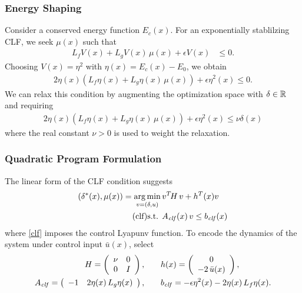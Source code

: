 \begin{frame}
  \frametitle{Energy Shaping}
  Consider a conserved energy function $E_{c}(x)$. For an exponentially stablilzing CLF, we seek $\mu(x)$ such that
  \begin{align*}
    L_f V(x) + L_g V(x) \, \mu(x) + \epsilon V(x) &\leq 0.
  \end{align*}
  Choosing $V(x) = \eta^2$ with $\eta(x) = E_{c}(x) - E_{0}$, we obtain
  \begin{align*}
    2 \eta(x) \left(L_f \eta(x) + L_g \eta(x) \, \mu(x) \right) + \epsilon \eta^2(x) \leq 0.
  \end{align*}
  We can relax this condition by augmenting the optimization space with $\delta \in \mathbb{R}$ and requiring
  \begin{align*}
    2 \eta(x) \left(L_f \eta(x) + L_g \eta(x) \, \mu(x) \right) + \epsilon \eta^2(x) \leq \nu \delta(x)
  \end{align*}
  where the real constant $\nu > 0$ is used to weight the relaxation.
\end{frame}

\begin{frame}[t]
  \frametitle{Quadratic Program Formulation}
  The linear form of the CLF condition suggests
  \begin{align}
    \nonumber
    (\delta^*(x), \mu(x)) = \argmin_{v = (\delta, u)}  \, & v^T \! H \, v + h^T(x) v\\
    \label{clf} \tag{clf}
    \mbox{s.t. } & \Aclf(x) \, v \leq \bclf(x)%
  \end{align}
  where \eqref{clf} imposes the control Lyapunv function. To encode the dynamics of the system under control input ${\bar u}(x)$, select
  \begin{align*}
    H = \left(\begin{array}{c c}\nu & 0\\ 0 & I\end{array}\right), & \qquad
      h(x) = \left(\begin{array}{c} 0\\ -2 \, \bar u(x) \end{array}\right),\\
      A_{\mathit{clf}} = \left(\begin{array}{c c}
        -1 & 2 \eta(x) \, L_{g} \eta(x)
      \end{array}\right), & \qquad
      b_{\mathit{clf}} = -\epsilon \eta^{2}(x) - 2\eta(x) \, L_{f} \eta(x).
  \end{align*}
\end{frame}


